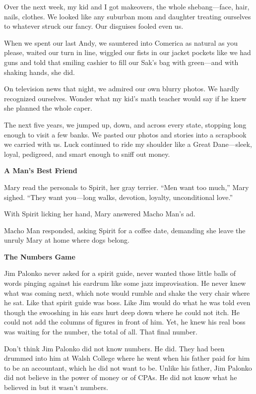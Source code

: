 \documentclass[
]{article}
\begin{document}
Over the next week, my kid and I got makeovers, the whole
shebang---face, hair, nails, clothes. We looked like any suburban mom
and daughter treating ourselves to whatever struck our fancy. Our
disguises fooled even us.

When we spent our last Andy, we sauntered into Comerica as natural as
you please, waited our turn in line, wiggled our fists in our jacket
pockets like we had guns and told that smiling cashier to fill our Sak's
bag with green---and with shaking hands, she did.

On television news that night, we admired our own blurry photos. We
hardly recognized our­selves. Wonder what my kid's math teacher would
say if he knew she planned the whole caper.

The next five years, we jumped up, down, and across every state,
stopping long enough to visit a few banks. We pasted our photos and
stories into a scrapbook we carried with us. Luck continued to ride my
shoulder like a Great Dane---sleek, loyal, pedigreed, and smart enough
to sniff out money.

\textbf{\hfill\break
}

\textbf{A Man's Best Friend}

Mary read the personals to Spirit, her gray terrier. ``Men want too
much,'' Mary sighed. ``They want you---long walks, devotion, loyalty,
unconditional love.''

With Spirit licking her hand, Mary answered Macho Man's ad.

Macho Man responded, asking Spirit for a coffee date, demanding she
leave the unruly Mary at home where dogs belong.

\textbf{\hfill\break
}

\textbf{The Numbers Game}

Jim Palonko never asked for a spirit guide, never wanted those little
balls of words pinging against his eardrum like some jazz improvisation.
He never knew what was coming next, which note would rumble and shake
the very chair where he sat. Like that spirit guide was boss. Like Jim
would do what he was told even though the swooshing in his ears hurt
deep down where he could not itch. He could not add the columns of
figures in front of him. Yet, he knew his real boss was waiting for the
number, the total of all. That final number.

Don't think Jim Palonko did not know numbers. He did. They had been
drummed into him at Walsh College where he went when his father paid for
him to be an accountant, which he did not want to be. Unlike his father,
Jim Palonko did not believe in the power of money or of CPAs. He did not
know what he believed in but it wasn't numbers.
\end{document}
